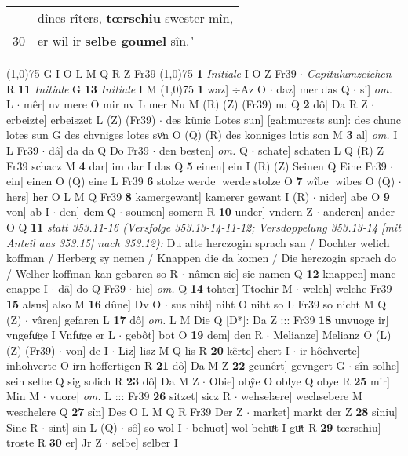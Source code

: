 \documentclass[8pt,a4paper,notitlepage]{article}
\begin{document}
\begin{table}[ht]
\begin{minipage}[t]{0.5\linewidth}
\begin{tabular}{rl}
 & dînes rîters, \textbf{tœrschiu} swester mîn,\\ 
30 & er wil ir \textbf{selbe goumel} sîn."\\ 
\end{tabular}
\scriptsize
\line(1,0){75} \newline
G I O L M Q R Z Fr39 \newline
\line(1,0){75} \newline
\textbf{1} \textit{Initiale} I O Z Fr39   $\cdot$ \textit{Capitulumzeichen} R  \textbf{11} \textit{Initiale} G  \textbf{13} \textit{Initiale} I M  \newline
\line(1,0){75} \newline
\textbf{1} waz] ÷Az O  $\cdot$ daz] mer das Q  $\cdot$ si] \textit{om.} L  $\cdot$ mêr] nv mere O mir nv L mer Nu M (R) (Z) (Fr39) nu Q \textbf{2} dô] Da R Z  $\cdot$ erbeizte] erbeiszet L (Z) (Fr39)  $\cdot$ des künic Lotes sun] [gahmurests sun]: des chunc lotes sun G des chvniges lotes svͦn O (Q) (R) des konniges lotis son M \textbf{3} al] \textit{om.} I L Fr39  $\cdot$ dâ] da da Q Do Fr39  $\cdot$ den besten] \textit{om.} Q  $\cdot$ schate] schaten L Q (R) Z Fr39 schacz M \textbf{4} dar] im dar I das Q \textbf{5} einen] ein I (R) (Z) Seinen Q Eine Fr39  $\cdot$ ein] einen O (Q) eine L Fr39 \textbf{6} stolze werde] werde stolze O \textbf{7} wîbe] wibes O (Q)  $\cdot$ hers] her O L M Q Fr39 \textbf{8} kamergewant] kamerer gewant I (R)  $\cdot$ nider] abe O \textbf{9} von] ab I  $\cdot$ den] dem Q  $\cdot$ soumen] somern R \textbf{10} under] vndern Z  $\cdot$ anderen] ander O Q \textbf{11} \textit{statt 353.11-16 (Versfolge 353.13-14-11-12; Versdoppelung 353.13-14 [mit Anteil aus 353.15] nach 353.12):} Du alte herczogin sprach san / Dochter welich koffman / Herberg sy nemen / Knappen die da komen / Die herczogin sprach do / Welher koffman kan gebaren so R   $\cdot$ nâmen sie] sie namen Q \textbf{12} knappen] manc cnappe I  $\cdot$ dâ] do Q Fr39  $\cdot$ hie] \textit{om.} Q \textbf{14} tohter] Ttochir M  $\cdot$ welch] welche Fr39 \textbf{15} alsus] also M \textbf{16} dûne] Dv O  $\cdot$ sus niht] niht O niht so L Fr39 so nicht M Q (Z)  $\cdot$ vâren] gefaren L \textbf{17} dô] \textit{om.} L M Die Q [D*]: Da Z ::: Fr39 \textbf{18} unvuoge ir] vngefuͦge I Vnfuͯge er L  $\cdot$ gebôt] bot O \textbf{19} dem] den R  $\cdot$ Melianze] Melianz O (L) (Z) (Fr39)  $\cdot$ von] de I  $\cdot$ Liz] lisz M Q lis R \textbf{20} kêrte] chert I  $\cdot$ ir hôchverte] inhohverte O irn hoffertigen R \textbf{21} dô] Da M Z \textbf{22} geunêrt] gevngert G  $\cdot$ sîn solhe] sein selbe Q sig solich R \textbf{23} dô] Da M Z  $\cdot$ Obie] obŷe O oblye Q obye R \textbf{25} mir] Min M  $\cdot$ vuore] \textit{om.} L ::: Fr39 \textbf{26} sitzet] sicz R  $\cdot$ wehselære] wechsebere M weschelere Q \textbf{27} sîn] Des O L M Q R Fr39 Der Z  $\cdot$ market] markt der Z \textbf{28} sîniu] Sine R  $\cdot$ sint] sin L (Q)  $\cdot$ sô] so wol I  $\cdot$ behuot] wol behuͤt I guͦt R \textbf{29} tœrschiu] troste R \textbf{30} er] Jr Z  $\cdot$ selbe] selber I \newline

\end{minipage}
\end{table}
\end{document}
